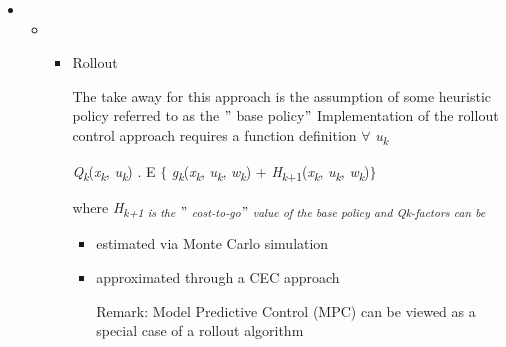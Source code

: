 \documentclass[12pt,twoside]{article}
\begin{document}
\begin{itemize}
	\item \begin{itemize}
	\item \begin{itemize}
	\item Rollout\par


\vspace{\baselineskip}
{\fontsize{10pt}{12.0pt}\selectfont The take away for this approach is the assumption of some heuristic policy referred to as the $"$ base policy$"$  Implementation of the rollout control approach requires a function definition $ \forall $ \textit{u\textsubscript{k}}\par}\par

\begin{FlushLeft}
{\fontsize{10pt}{12.0pt}\selectfont \textit{Q\textsubscript{k}}(\textit{x\textsubscript{k}}, \textit{u\textsubscript{k}}) . E $ \{ $ \textit{g\textsubscript{k}}(\textit{x\textsubscript{k}}, \textit{u\textsubscript{k}}, \textit{w\textsubscript{k}}) + \textit{H\textsubscript{k}}\textsubscript{+1}(\textit{x\textsubscript{k}}, \textit{u\textsubscript{k}}, \textit{w\textsubscript{k}})$ \} $ \par}
\end{FlushLeft}\par


\vspace{\baselineskip}
{\fontsize{10pt}{12.0pt}\selectfont where \textit{H\textsubscript{k+1 is the $"$ cost-to-go$"$  value of the base policy and Qk-factors can be}}\par}\par


\vspace{\baselineskip}
\begin{itemize}
	\item {\fontsize{10pt}{12.0pt}\selectfont estimated via Monte Carlo simulation\par}\par

	\item {\fontsize{10pt}{12.0pt}\selectfont approximated through a CEC approach\par}\par

{\fontsize{10pt}{12.0pt}\selectfont Remark: Model Predictive Control (MPC) can be viewed as a special case of a rollout algorithm\par}\par



\end{itemize}
\end{itemize}
\end{itemize}
\end{itemize}
\end{document}
